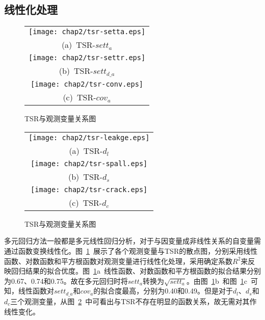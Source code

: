 \subsection{线性化处理}

\begin{figure}[htbp!] 
    \centering 
    \begin{tabular}{c} 
        \texttt{[image: chap2/tsr-setta.eps]} \\ 
        (a)~TSR-${sett}_{a}$ \\
        \texttt{[image: chap2/tsr-settr.eps]} \\ 
        (b)~TSR-$set{{t}_{d\_a}}$ \\
        \texttt{[image: chap2/tsr-conv.eps]} \\ 
        (c)~TSR-${cov}_{a}$ \\
    \end{tabular}
    \caption{TSR与观测变量关系图} 
    \label{fig:TSR与观测变量关系图} 
\end{figure}

\begin{figure}[htbp!] 
    \centering 
    \begin{tabular}{c} 
        \texttt{[image: chap2/tsr-leakge.eps]} \\ 
        (a)~TSR-${d}_{l}$ \\
        \texttt{[image: chap2/tsr-spall.eps]} \\ 
        (b)~TSR-$d_s$ \\
        \texttt{[image: chap2/tsr-crack.eps]} \\ 
        (c)~TSR-$d_c$ \\
    \end{tabular}
    \caption{TSR与观测变量关系图} 
    \label{fig:TSR与观测变量关系图2} 
\end{figure}

多元回归方法一般都是多元线性回归分析，对于与因变量成非线性关系的自变量需通过函数变换线性化。图~\ref{fig:TSR与观测变量关系图}~展示了各个观测变量与TSR的散点图，分别采用线性函数、对数函数和平方根函数对观测变量进行线性化处理，采用确定系数$R^2$来反映回归结果的拟合优度。图~\ref{fig:TSR与观测变量关系图}a~线性函数、对数函数和平方根函数的拟合结果分别为0.67、0.74和0.75。故在多元回归时将${sett}_{a}$转换为$\sqrt{sett_a}$。由图~\ref{fig:TSR与观测变量关系图}b~和图~\ref{fig:TSR与观测变量关系图}c~可知，线性函数对$set{{t}_{d\_a}}$和${cov}_{a}$的拟合度最高，分别为0.40和0.49。但是对于${d}_{l}$、$d_s$和$d_c$三个观测变量，从图~\ref{fig:TSR与观测变量关系图2}~中可看出与TSR不存在明显的函数关系，故无需对其作线性变化。

